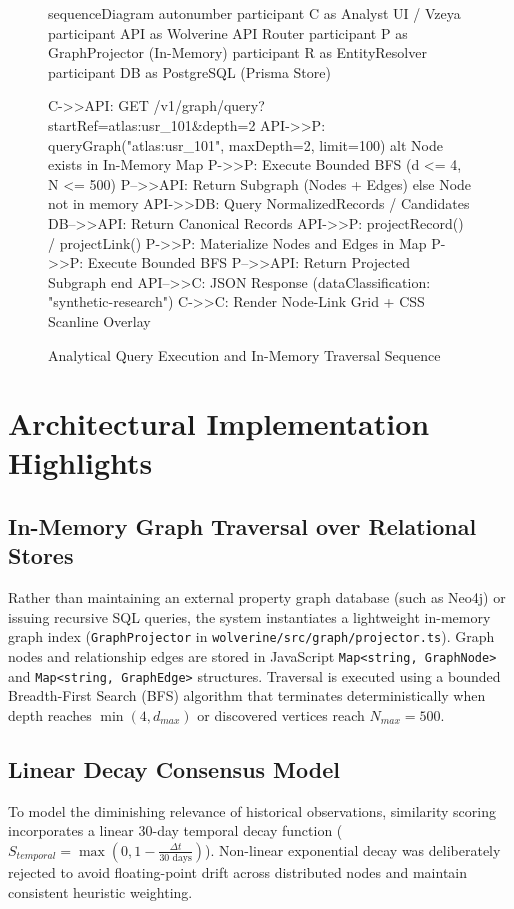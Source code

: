 \begin{figure}[htpb]
\centering
\begin{mermaid}
sequenceDiagram
    autonumber
    participant C as Analyst UI / Vzeya
    participant API as Wolverine API Router
    participant P as GraphProjector (In-Memory)
    participant R as EntityResolver
    participant DB as PostgreSQL (Prisma Store)
    
    C->>API: GET /v1/graph/query?startRef=atlas:usr_101&depth=2
    API->>P: queryGraph("atlas:usr_101", maxDepth=2, limit=100)
    alt Node exists in In-Memory Map
        P->>P: Execute Bounded BFS (d <= 4, N <= 500)
        P-->>API: Return Subgraph (Nodes + Edges)
    else Node not in memory
        API->>DB: Query NormalizedRecords / Candidates
        DB-->>API: Return Canonical Records
        API->>P: projectRecord() / projectLink()
        P->>P: Materialize Nodes and Edges in Map
        P->>P: Execute Bounded BFS
        P-->>API: Return Projected Subgraph
    end
    API-->>C: JSON Response (dataClassification: "synthetic-research")
    C->>C: Render Node-Link Grid + CSS Scanline Overlay
\end{mermaid}
\caption{Analytical Query Execution and In-Memory Traversal Sequence}
\label{fig:control_flow}
\end{figure}

\section{Architectural Implementation Highlights}
\label{sec:arch_impl}

\subsection{In-Memory Graph Traversal over Relational Stores}
Rather than maintaining an external property graph database (such as Neo4j) or issuing recursive SQL queries, the system instantiates a lightweight in-memory graph index (\texttt{GraphProjector} in \texttt{wolverine/src/graph/projector.ts}). Graph nodes and relationship edges are stored in JavaScript \texttt{Map<string, GraphNode>} and \texttt{Map<string, GraphEdge>} structures. Traversal is executed using a bounded Breadth-First Search (BFS) algorithm that terminates deterministically when depth reaches $\min(4, d_{max})$ or discovered vertices reach $N_{max} = 500$.

\subsection{Linear Decay Consensus Model}
To model the diminishing relevance of historical observations, similarity scoring incorporates a linear 30-day temporal decay function ($S_{temporal} = \max(0, 1 - \frac{\Delta t}{30\text{ days}})$). Non-linear exponential decay was deliberately rejected to avoid floating-point drift across distributed nodes and maintain consistent heuristic weighting.

